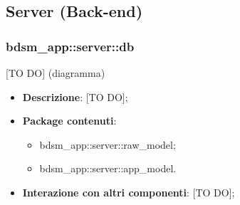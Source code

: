 


\subsection{Server (Back-end)} %
\label{sub:server}
  \subsubsection{bdsm\_app::server::db} %
  \label{ssub:bdsm_app_server_db}
  [TO DO] (diagramma) \newline \newline

  \begin{itemize}
    \item \textbf{Descrizione}: [TO DO];
    \item \textbf{Package contenuti}:
      \begin{itemize}
        \item bdsm\_app::server::raw\_model;
        \item bdsm\_app::server::app\_model.
      \end{itemize}
    \item \textbf{Interazione con altri componenti}: [TO DO];
  \end{itemize}



